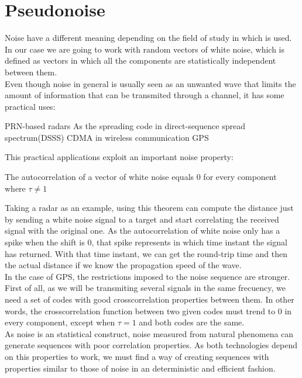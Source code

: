\section{Pseudonoise}

Noise have a different meaning depending on the field of study in which is
used. In our case we are going to work with random vectors of white noise,
which is defined as vectors in which all the components are statistically
independent between them.\cite{white_noise}\\

Even though noise in general is usually seen as an unwanted wave that
limits the amount of information that can be transmited through a
channel\cite{shannon_noise}, it has some practical uses:


\begin{outline}
  \1 PRN-based radars\cite{prn_radar_example1}\cite{prn_radar_example2}
  \1 As the spreading code in direct-sequence spread spectrum(DSSS) \cite{DSSS_1}\cite{DSSS}
    \2 CDMA in wireless communication\cite{DSSS}
    \2 GPS\cite{GPS}
\end{outline}

This practical applications exploit an important noise property:

\begin{property}
  The autocorrelation of a vector of white noise equals 0 for every component
  where $\tau \neq 1$ \cite{everett}
\end{property}

Taking a radar as an example, using this theorem can compute the distance
just by sending a white noise signal to a target and start correlating the
received signal with the original one. As the autocorrelation of
white noise only has a spike when the shift is 0, that spike represents in
which time instant the signal has returned. With that time instant, we can
get the round-trip time and then the actual distance if we know the
propagation speed of the wave.\\

In the case of GPS, the restrictions imposed to the noise sequence are
stronger. First of all, as we will be transmiting several signals in the same
frecuency, we need a set of codes with good crosscorrelation properties
between them. In other words, the crosscorrelation function between two given
codes must trend to 0 in every component, except when $\tau = 1$ and
both codes are the same.\\

As noise is an statistical construct, noise measured from natural phenomena
can generate sequences with poor correlation properties. As both technologies
depend on this properties to work, we must find a way of creating sequences
with properties similar to those of noise in an deterministic and efficient
fashion.\\

